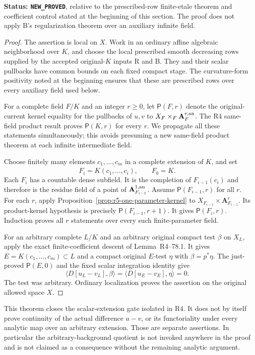 \documentclass[11pt,a4paper]{article}
\numberwithin{equation}{section}
\theoremstyle{definition}
\theoremstyle{remark}
\begin{document}
\noindent\textbf{Status: \texttt{NEW\_PROVED}}, relative to the
prescribed-row finite-etale theorem and coefficient control stated
at the beginning of this section.  The proof does not apply B's
regularization theorem over an auxiliary infinite field.

\begin{proof}
The assertion is local on $X$.  Work in an ordinary affine
algebraic neighborhood over $K$, and choose the local prescribed
smooth decreasing rows supplied by the accepted original-$K$
inputs R and B.  They and their scalar pullbacks have common bounds
on each fixed compact stage.  The curvature-form positivity noted
at the beginning ensures that these are prescribed rows over every
auxiliary field used below.

For a complete field $F/K$ and an integer $r\geq0$, let
$\mathsf P(F,r)$ denote the original-current kernel equality for
the pullbacks of $u,v$ to
$X_F\times_F\mathbf A_F^{r,\rm an}$.  The R4 same-field product
result proves $\mathsf P(K,r)$ for every $r$.  We propagate all
these statements simultaneously; this avoids presuming a new
same-field product theorem at each infinite intermediate field.

Choose finitely many elements $c_1,\ldots,c_m$ in a complete
extension of $K$, and set
\[
 F_i=\overline{K(c_1,\ldots,c_i)},\qquad F_0=K.
\]
Each $F_i$ has a countable dense subfield.  It is the completion
of $F_{i-1}(c_i)$ and therefore is the residue field of a point of
$\mathbf A_{F_{i-1}}^{1,\rm an}$.  Assume
$\mathsf P(F_{i-1},r)$ for all $r$.  For each $r$, apply
Proposition~\ref{prop:r5-one-parameter-kernel} to
$X_{F_{i-1}}\times\mathbf A_{F_{i-1}}^r$.  Its product-kernel
hypothesis is precisely $\mathsf P(F_{i-1},r+1)$.
It gives $\mathsf P(F_i,r)$.  Induction proves all $r$ statements
over every such finite-parameter field.

For an arbitrary complete $L/K$ and an arbitrary original compact
test $\beta$ on $X_L$, apply the exact finite-coefficient descent
of Lemma~\textup{R4--78.1}.  It gives
$E=\overline{K(c_1,\ldots,c_m)}\subset L$ and a compact original
$E$-test $\eta$ with $\beta=p^*\eta$.  The just-proved
$\mathsf P(E,0)$ and the fixed scalar integration identity give
\[
 \langle D[u_L-v_L],\beta\rangle
       =\langle D[u_E-v_E],\eta\rangle=0.
\]
The test was arbitrary.  Ordinary localization proves the
assertion on the original allowed space $X$.
\end{proof}

This theorem closes the scalar-extension gate isolated in R4.
It does not by itself prove continuity of the actual difference
$u-v$, or its functoriality under every analytic map over an
arbitrary extension.  Those are separate assertions.  In particular
the arbitrary-background quotient is not invoked anywhere in the
proof and is not claimed as a consequence without the remaining
analytic argument.
\end{document}
